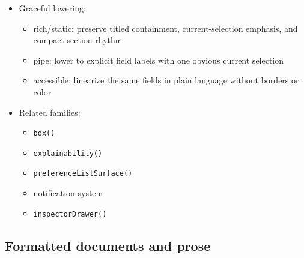 \begin{itemize}
  \begin{itemize}
  \tightlist
  \item
    core
  \end{itemize}
\item
  Graceful lowering:

  \begin{itemize}
  \tightlist
  \item
    rich/static: preserve titled containment, current-selection emphasis, and compact section rhythm
  \item
    pipe: lower to explicit field labels with one obvious current selection
  \item
    accessible: linearize the same fields in plain language without borders or color
  \end{itemize}
\item
  Related families:

  \begin{itemize}
  \tightlist
  \item
    \texttt{b\allowbreak{}o\allowbreak{}x\allowbreak{}(\allowbreak{})}
  \item
    \texttt{e\allowbreak{}x\allowbreak{}p\allowbreak{}l\allowbreak{}a\allowbreak{}i\allowbreak{}n\allowbreak{}a\allowbreak{}b\allowbreak{}i\allowbreak{}l\allowbreak{}i\allowbreak{}t\allowbreak{}y\allowbreak{}(\allowbreak{})}
  \item
    \texttt{p\allowbreak{}r\allowbreak{}e\allowbreak{}f\allowbreak{}e\allowbreak{}r\allowbreak{}e\allowbreak{}n\allowbreak{}c\allowbreak{}e\allowbreak{}L\allowbreak{}i\allowbreak{}s\allowbreak{}t\allowbreak{}S\allowbreak{}u\allowbreak{}r\allowbreak{}f\allowbreak{}a\allowbreak{}c\allowbreak{}e\allowbreak{}(\allowbreak{})}
  \item
    notification system
  \item
    \texttt{i\allowbreak{}n\allowbreak{}s\allowbreak{}p\allowbreak{}e\allowbreak{}c\allowbreak{}t\allowbreak{}o\allowbreak{}r\allowbreak{}D\allowbreak{}r\allowbreak{}a\allowbreak{}w\allowbreak{}e\allowbreak{}r\allowbreak{}(\allowbreak{})}
  \end{itemize}
\end{itemize}

\subsection{Formatted documents and prose}\label{record-019-formatted-documents-and-prose}

